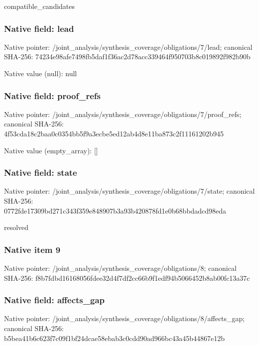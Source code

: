 \documentclass[10pt,a4paper]{article}
\begin{document}
\begingroup\raggedright\sloppy compatible\_\allowbreak{}candidates\par\endgroup

\subsubsection{Native field: lead}
Native pointer: /joint\_\allowbreak{}analysis/synthesis\_\allowbreak{}coverage/obligations/7/lead; canonical SHA-256: 74234e98afe7498fb5daf1f36ac2d78acc339464f950703b8c019892f982b90b

Native value (null): null

\subsubsection{Native field: proof\_\allowbreak{}refs}
Native pointer: /joint\_\allowbreak{}analysis/synthesis\_\allowbreak{}coverage/obligations/7/proof\_\allowbreak{}refs; canonical SHA-256: 4f53cda18c2baa0c0354bb5f9a3ecbe5ed12ab4d8e11ba873c2f11161202b945

Native value (empty\_\allowbreak{}array): []

\subsubsection{Native field: state}
Native pointer: /joint\_\allowbreak{}analysis/synthesis\_\allowbreak{}coverage/obligations/7/state; canonical SHA-256: 0772fde17309bd271c343f359e848907b3a93b420878fd1e0b68bbdadcd98eda

\begingroup\raggedright\sloppy resolved\par\endgroup

\subsubsection{Native item 9}
Native pointer: /joint\_\allowbreak{}analysis/synthesis\_\allowbreak{}coverage/obligations/8; canonical SHA-256: f8b7fdbd16168056fdee32d4f7df2cc66b9f1edf94b5066452b8ab00fc13a37c

\subsubsection{Native field: affects\_\allowbreak{}gap}
Native pointer: /joint\_\allowbreak{}analysis/synthesis\_\allowbreak{}coverage/obligations/8/affects\_\allowbreak{}gap; canonical SHA-256: b5bea41b6c623f7c09f1bf24dcae58ebab3c0cdd90ad966bc43a45b44867e12b
\end{document}
